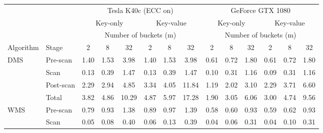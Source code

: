 \newlength{\runtimefirstcol}
\setlength{\runtimefirstcol}{0.4in}
\begin{table}
  \centering
  \scriptsize
  \begin{tabular}{p{\runtimefirstcol}lccc|ccc || ccc|ccc}
  	& & \multicolumn{6}{c}{Tesla K40c (ECC on)} & \multicolumn{6}{c}{GeForce GTX 1080} \\ 
  	\cmidrule(r){3-8}\cmidrule(l){9-14}
    & & \multicolumn{3}{c}{Key-only} & \multicolumn{3}{c}{Key-value} & \multicolumn{3}{c}{Key-only} & \multicolumn{3}{c}{Key-value}\\
    \cmidrule(r){3-5} \cmidrule(r){6-8} \cmidrule(l){9-11} \cmidrule(r){12-14}
    & & \multicolumn{6}{c}{Number of buckets (m)} & \multicolumn{6}{c}{Number of buckets (m)} \\
    \cmidrule(r){3-8} \cmidrule(l){9-14}
    Algorithm & Stage 
    & 2 & 8 & 32 & 2 & 8 & 32 
    & 2 & 8 & 32 & 2 & 8 & 32 \\
    \toprule
    \multirow{4}{*}{\parbox{\runtimefirstcol}{DMS}} 
    & Pre-scan 
    	& 1.40 & 1.53 & 3.98 & 1.40 & 1.53 & 3.98 
    	& 0.61 & 0.72 & 1.80 & 0.61 & 0.72 & 1.80 \\ 
    & Scan 
    	& 0.13 & 0.39 & 1.47 & 0.13 & 0.39 & 1.47
	    & 0.10 & 0.31 & 1.16 & 0.09  & 0.31  & 1.16 \\  
    & Post-scan 
    	& 2.29  & 2.94 & 4.85 & 3.34  & 4.05  & 11.84 
    	& 1.19  & 2.02  & 3.10 & 2.29  & 3.71  & 6.60 \\  
    & Total 
    	& 3.82 & 4.86 & 10.29 & 4.87  & 5.97  & 17.28 
    	& 1.90 & 3.05  & 6.06 & 3.00  & 4.74  & 9.56 \\ 
    \midrule    
    \multirow{4}{*}{\parbox{\runtimefirstcol}{WMS}} 
    & Pre-scan 
        & 0.79 & 0.93 & 1.38 & 0.89 & 0.97 & 1.39 
        & 0.58 & 0.60 & 0.93 & 0.59 & 0.62 & 0.93 \\ 
    & Scan 
        & 0.05 & 0.08 & 0.40 & 0.06 & 0.13 & 0.39
        & 0.04 & 0.06 & 0.31 & 0.04 & 0.10 & 0.31 \\  

\end{tabular}
\end{table}
